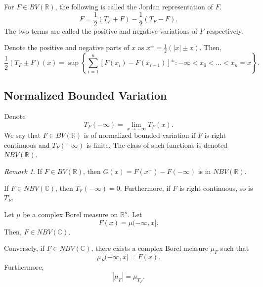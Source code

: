 \documentclass[11pt]{article}
\newcommand{\C}{\mathbb{C}}
\newcommand{\R}{\mathbb{R}}
\theoremstyle{definition}
\theoremstyle{remark}
\newtheorem*{remark}{Remark}
\begin{document}
    \begin{definition}
        For $F \in BV(\R)$, the following is called the Jordan representation of $F$.
        \[
            F = \frac{1}{2}(T_F + F) - \frac{1}{2}(T_F - F).
        \] The two terms are called the positive and negative variations of $F$
        respectively.
    \end{definition}

    \begin{lemma}
        Denote the positive and negative parts of $x$ as $x^\pm = \frac{1}{2}(|x| \pm
        x)$. Then, \[
            \frac{1}{2}(T_F \pm F)(x) = \sup\left\{\sum_{i = 1}^n \left[F(x_i) -
            F(x_{i - 1})\right]^\pm : -\infty < x_0 < \dots < x_n = x\right\}.
        \]
    \end{lemma}


    \subsection{Normalized Bounded Variation}

    \begin{definition}
        Denote \[
            T_F(-\infty) = \lim_{x \to -\infty} T_F(x).
        \] We say that $F \in BV(\R)$ is of normalized bounded variation if $F$ is
        right continuous and $T_F(-\infty)$ is finite. The class of such functions is
        denoted $NBV(\R)$.

        \begin{remark}
            If $F \in BV(\R)$, then $G(x) = F(x^+) - F(-\infty)$ is in $NBV(\R)$.
        \end{remark}
    \end{definition}

    \begin{lemma}
        If $F \in NBV(\C)$, then $T_F(-\infty) = 0$. Furthermore, if $F$ is right
        continuous, so is $T_F$.
    \end{lemma}

    \begin{theorem}
        Let $\mu$ be a complex Borel measure on $\R^n$. Let \[
            F(x) = \mu(-\infty, x].
        \] Then, $F \in NBV(\C)$.

        Conversely, if $F \in NBV(\C)$, there exists a complex Borel measure $\mu_F$
        such that \[
            \mu_F(-\infty, x] = F(x).
        \] Furthermore, \[
            |\mu_F| = \mu_{T_F}.
        \]
    \end{theorem}
\end{document}
